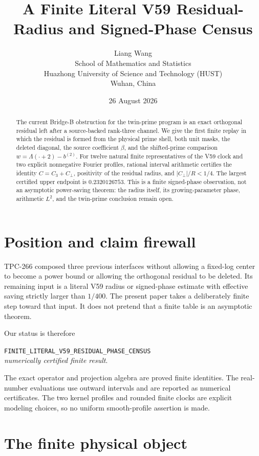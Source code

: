 \documentclass[11pt]{article}
\title{A Finite Literal V59 Residual-Radius and Signed-Phase Census}
\author{Liang Wang\\School of Mathematics and Statistics\\Huazhong University of Science and Technology (HUST)\\Wuhan, China}
\date{26 August 2026}
\begin{document}
\maketitle

\begin{abstract}
The current Bridge-B obstruction for the twin-prime program is an exact
orthogonal residual left after a source-backed rank-three channel.  We give
the first finite replay in which the residual is formed from the physical
prime shell, both unit masks, the deleted diagonal, the source coefficient
\(\beta\), and the shifted-prime comparison \(w=\Lambda(\cdot+2)-b^{(2)}\).
For twelve natural finite representatives of the V59 clock and two explicit
nonnegative Fourier profiles, rational interval arithmetic certifies the
identity \(C=C_3+C_\perp\), positivity of the residual radius, and
\(\lvert C_\perp\rvert/R<1/4\).  The largest certified upper endpoint is
\(0.2320126753\).  This is a finite signed-phase observation, not an
asymptotic power-saving theorem: the radius itself, its growing-parameter
phase, arithmetic \(L^2\), and the twin-prime conclusion remain open.
\end{abstract}

\section{Position and claim firewall}

TPC-266 composed three previous interfaces without allowing a fixed-log
center to become a power bound or allowing the orthogonal residual to be
deleted.  Its remaining input is a literal V59 radius or signed-phase
estimate with effective saving strictly larger than \(1/400\).  The present
paper takes a deliberately finite step toward that input.  It does not
pretend that a finite table is an asymptotic theorem.

Our status is therefore
\begin{center}
\small\texttt{FINITE\_LITERAL\_V59\_RESIDUAL\_PHASE\_CENSUS}\\
\textit{numerically certified finite result}.
\end{center}
The exact operator and projection algebra are proved finite identities.  The
real-number evaluations use outward intervals and are reported as numerical
certificates.  The two kernel profiles and rounded finite clocks are explicit
modeling choices, so no uniform smooth-profile assertion is made.

\section{The finite physical object}
\end{document}
